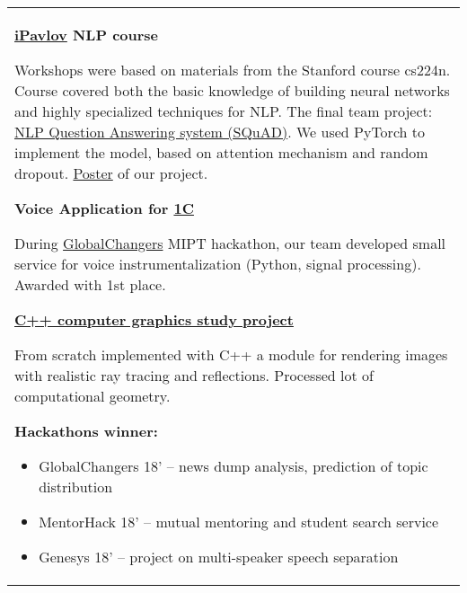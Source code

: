 \documentclass[a4paper,12pt]{memoir} %
\newcommand{\opendialog}{\bluebullet}
\newcommand{\bullitem}[1]{\opendialog #1}
\begin{document}
	\begin{tabular}{p{} }
	\bullitem{ \textbf{\href{http://ipavlov.ai/\#edu}{iPavlov} NLP course} }
	
	Workshops were based on materials from the Stanford course cs224n. Course covered both the basic knowledge of building neural networks and highly specialized techniques for NLP. The final team project: \href{https://github.com/celidos/SQUAD_NLP}{NLP Question Answering system (SQuAD)}. We used PyTorch to implement the model, based on attention mechanism and random dropout. \href{https://github.com/celidos/SQUAD_NLP/blob/master/poster.pdf}{Poster} of our project.

	\SepSep
	\bullitem{\textbf{Voice Application for \href{http://1c.ru/eng/title.htm}{1C}}}
	
	During \href{https://github.com/celidos/hck_Global_Changers}{GlobalChangers} MIPT hackathon, our team developed small service for voice instrumentalization (Python, signal processing). Awarded with 1st place.\
	
	\SepSep
	\bullitem{\textbf{\href{https://github.com/celidos/programming-mipt-2015-2017/tree/master/RAY_TRACING}{C++ computer graphics study project}}} 
	
	From scratch implemented with C++ a module for rendering images with realistic ray tracing and reflections. Processed lot of computational geometry.
	
	\bullitem{ \textbf{Hackathons winner:} }
	\begin{itemize}
		\item 	GlobalChangers 18’ – news dump analysis, prediction of topic distribution
		\item MentorHack 18’ – mutual mentoring and student search service
		\item Genesys 18’ – project on multi-speaker speech separation
	\end{itemize}
	

	
	
	
	
	\end{tabular}	

	\Sep
	
\end{document}

